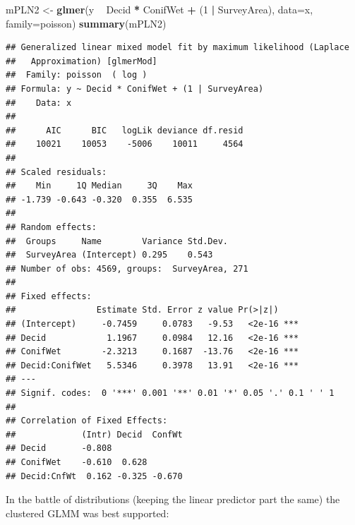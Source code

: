 \documentclass[12pt,]{book}
\newenvironment{Shaded}{\begin{snugshade}}{\end{snugshade}}
\newcommand{\DataTypeTok}[1]{\textcolor[rgb]{0.13,0.29,0.53}{#1}}
\newcommand{\DecValTok}[1]{\textcolor[rgb]{0.00,0.00,0.81}{#1}}
\newcommand{\KeywordTok}[1]{\textcolor[rgb]{0.13,0.29,0.53}{\textbf{#1}}}
\newcommand{\NormalTok}[1]{#1}
\newcommand{\OperatorTok}[1]{\textcolor[rgb]{0.81,0.36,0.00}{\textbf{#1}}}
\newcommand{\StringTok}[1]{\textcolor[rgb]{0.31,0.60,0.02}{#1}}
\begin{document}
\begin{Shaded}
\begin{Highlighting}[]
\NormalTok{mPLN2 <-}\StringTok{ }\KeywordTok{glmer}\NormalTok{(y }\OperatorTok{~}\StringTok{ }\NormalTok{Decid }\OperatorTok{*}\StringTok{ }\NormalTok{ConifWet }\OperatorTok{+}\StringTok{ }\NormalTok{(}\DecValTok{1} \OperatorTok{|}\StringTok{ }\NormalTok{SurveyArea), }\DataTypeTok{data=}\NormalTok{x, }\DataTypeTok{family=}\NormalTok{poisson)}
\KeywordTok{summary}\NormalTok{(mPLN2)}
\end{Highlighting}
\end{Shaded}

\begin{verbatim}
## Generalized linear mixed model fit by maximum likelihood (Laplace
##   Approximation) [glmerMod]
##  Family: poisson  ( log )
## Formula: y ~ Decid * ConifWet + (1 | SurveyArea)
##    Data: x
## 
##      AIC      BIC   logLik deviance df.resid 
##    10021    10053    -5006    10011     4564 
## 
## Scaled residuals: 
##    Min     1Q Median     3Q    Max 
## -1.739 -0.643 -0.320  0.355  6.535 
## 
## Random effects:
##  Groups     Name        Variance Std.Dev.
##  SurveyArea (Intercept) 0.295    0.543   
## Number of obs: 4569, groups:  SurveyArea, 271
## 
## Fixed effects:
##                Estimate Std. Error z value Pr(>|z|)    
## (Intercept)     -0.7459     0.0783   -9.53   <2e-16 ***
## Decid            1.1967     0.0984   12.16   <2e-16 ***
## ConifWet        -2.3213     0.1687  -13.76   <2e-16 ***
## Decid:ConifWet   5.5346     0.3978   13.91   <2e-16 ***
## ---
## Signif. codes:  0 '***' 0.001 '**' 0.01 '*' 0.05 '.' 0.1 ' ' 1
## 
## Correlation of Fixed Effects:
##             (Intr) Decid  ConfWt
## Decid       -0.808              
## ConifWet    -0.610  0.628       
## Decid:CnfWt  0.162 -0.325 -0.670
\end{verbatim}

In the battle of distributions (keeping the linear predictor
part the same) the clustered GLMM was best supported:

\begin{Shaded}
\end{Shaded}
\end{document}
